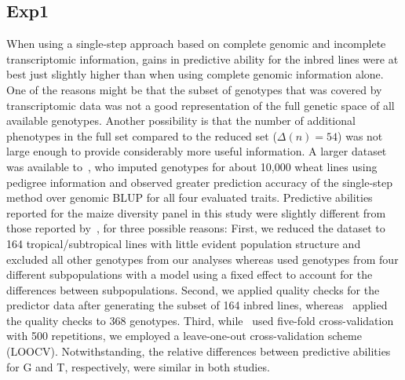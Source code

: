 \documentclass[12pt,titlepage]{article}
\begin{document}
\subsection{Exp1}
When using a single-step approach based on complete genomic and incomplete
transcriptomic information, gains in predictive ability for the inbred lines
were at best just slightly higher than when using complete genomic information
alone.
One of the reasons might be that the subset of genotypes that was covered by
transcriptomic data was not a good representation of the full genetic space of
all available genotypes.
Another possibility is that the number of additional phenotypes in the full
set compared to the reduced set ($\Delta(n) = 54$) was not large enough to
provide considerably more useful information.
A larger dataset was available to~, who imputed genotypes
for about 10,000 wheat lines using pedigree information and observed greater
prediction accuracy of the single-step method over genomic BLUP for all four
evaluated traits.
Predictive abilities reported for the maize diversity panel in this study were
slightly different from those reported by~, for three
possible reasons:
First, we reduced the dataset to 164 tropical/subtropical lines with little
evident population structure and excluded all other genotypes from our analyses
whereas  used genotypes from four different subpopulations with a 
model using a fixed effect to account for the differences between subpopulations.
Second, we applied quality checks for the predictor data after generating the
subset of 164 inbred lines, whereas~ applied the quality checks to
368 genotypes.
Third, while~ used five-fold cross-validation with 500 repetitions,
we employed a leave-one-out cross-validation scheme (LOOCV).
Notwithstanding, the relative differences between predictive abilities for G 
and T, respectively, were similar in both studies.
\end{document}
